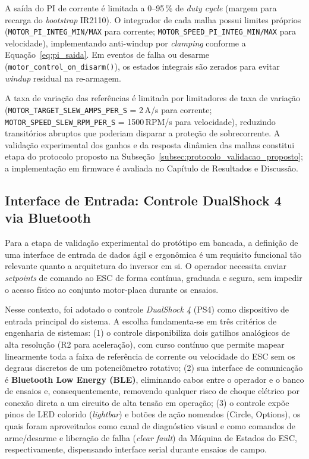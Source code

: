 A saída do PI de corrente é limitada a 0--95\,\% de \textit{duty cycle} (margem para recarga do \textit{bootstrap} IR2110). O integrador de cada malha possui limites próprios (\texttt{MOTOR\_PI\_INTEG\_MIN/MAX} para corrente; \texttt{MOTOR\_SPEED\_PI\_INTEG\_MIN/MAX} para velocidade), implementando anti-windup por \textit{clamping} conforme a Equação~\ref{eq:pi_saida}. Em eventos de falha ou desarme (\texttt{motor\_control\_on\_disarm()}), os estados integrais são zerados para evitar \textit{windup} residual na re-armagem.

A taxa de variação das referências é limitada por limitadores de taxa de variação (\texttt{MOTOR\_TARGET\_SLEW\_AMPS\_PER\_S} = 2\,A/s para corrente; \texttt{MOTOR\_SPEED\_SLEW\_RPM\_PER\_S} = 1500\,RPM/s para velocidade), reduzindo transitórios abruptos que poderiam disparar a proteção de sobrecorrente. A validação experimental dos ganhos e da resposta dinâmica das malhas constitui etapa do protocolo proposto na Subseção~\ref{subsec:protocolo_validacao_proposto}; a implementação em firmware é avaliada no Capítulo de Resultados e Discussão.

\subsection{Interface de Entrada: Controle DualShock 4 via Bluetooth}

Para a etapa de validação experimental do protótipo em bancada, a definição de uma interface de entrada de dados ágil e ergonômica é um requisito funcional tão relevante quanto a arquitetura do inversor em si. O operador necessita enviar \textit{setpoints} de comando ao ESC de forma contínua, graduada e segura, sem impedir o acesso físico ao conjunto motor-placa durante os ensaios.

Nesse contexto, foi adotado o controle \textit{DualShock 4} (PS4) como dispositivo de entrada principal do sistema. A escolha fundamenta-se em três critérios de engenharia de sistemas: (1) o controle disponibiliza dois gatilhos analógicos de alta resolução (R2 para aceleração), com curso contínuo que permite mapear linearmente toda a faixa de referência de corrente ou velocidade do ESC sem os degraus discretos de um potenciômetro rotativo; (2) sua interface de comunicação é \textbf{Bluetooth Low Energy (BLE)}, eliminando cabos entre o operador e o banco de ensaios e, consequentemente, removendo qualquer risco de choque elétrico por conexão direta a um circuito de alta tensão em operação; (3) o controle expõe pinos de LED colorido (\textit{lightbar}) e botões de ação nomeados (Circle, Options), os quais foram aproveitados como canal de diagnóstico visual e como comandos de arme/desarme e liberação de falha (\textit{clear fault}) da Máquina de Estados do ESC, respectivamente, dispensando interface serial durante ensaios de campo.

